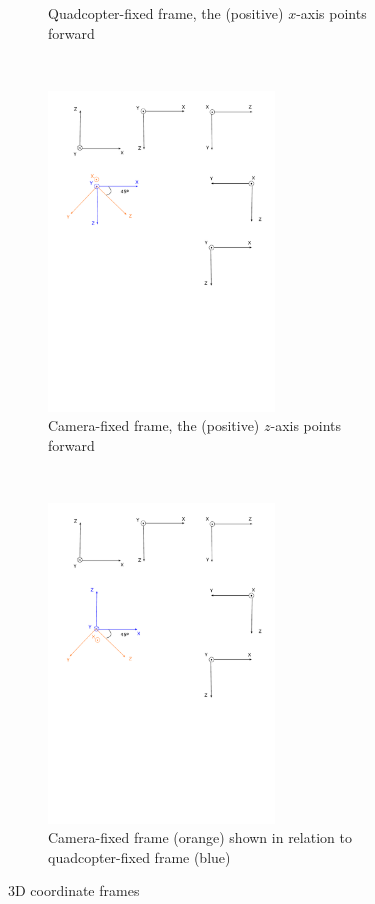 \documentclass[12pt,a4paper]{article}
\begin{document}
\begin{figure}[p]
\begin{subfigure}[t]{0.5\textwidth}
        \caption{Quadcopter-fixed frame, the (positive) $x$-axis points forward}
      \end{subfigure} %
      ~
      \begin{subfigure}[t]{0.5\textwidth}
      \centering
        \includegraphics[width=60mm, trim = 135mm 240mm 20mm 10mm, clip]{frames/frames.pdf}
        \caption{Camera-fixed frame, the (positive) $z$-axis points forward}
      \end{subfigure} %
      \\
      \begin{subfigure}[t]{\textwidth}
      \centering
        \includegraphics[width=60mm, trim = 10mm 150mm 125mm 75mm, clip]{frames/frames2.pdf}
        \caption{Camera-fixed frame (orange) shown in relation to quadcopter-fixed frame (blue)}
        \label{fs: frames c2q}
      \end{subfigure}
      \caption{3D coordinate frames}
      \label{f: frames}
    \end{figure}
\end{document}
